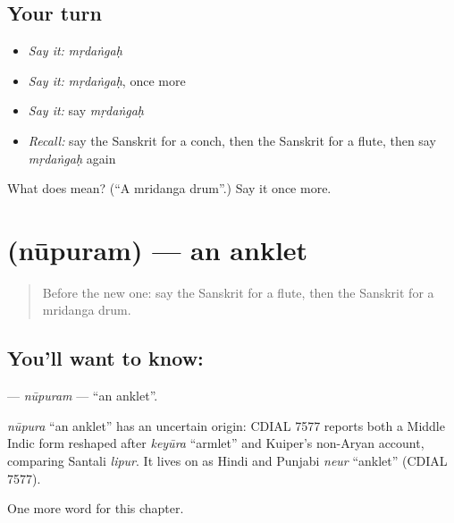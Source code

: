 \subsection*{Your turn}
\begin{itemize}
\raggedright
  \item \emph{Say it:} \emph{mṛdaṅgaḥ}
  \item \emph{Say it:} \emph{mṛdaṅgaḥ}, once more
  \item \emph{Say it:} say \emph{mṛdaṅgaḥ}
  \item \emph{Recall:} say the Sanskrit for a conch, then the Sanskrit for a flute, then say \emph{mṛdaṅgaḥ} again
\end{itemize}

\begin{tcolorbox}[breakable,colback=teal!4,colframe=teal!35!black,title={Before you move on}]
What does  mean? (\textquotedblleft{}A mridanga drum\textquotedblright{}.) Say it once more.
\end{tcolorbox}
\section[\texorpdfstring{\sk{नूपुरम्} (nūpuram)}{नूपुरम् (nūpuram)}]{ (nūpuram) — an anklet}

\label{lesson:SA-C161-nupuram}



\begin{quote}
Before the new one: say the Sanskrit for a flute, then the Sanskrit for a mridanga drum.
\end{quote}

\subsection*{You'll want to know: }
\textbf{} — \emph{nūpuram} — \textquotedblleft{}an anklet\textquotedblright{}.

\begin{cousinweb}
\emph{nūpura} \textquotedblleft{}an anklet\textquotedblright{} has an uncertain origin: CDIAL 7577 reports both a Middle Indic form reshaped after \emph{keyūra} \textquotedblleft{}armlet\textquotedblright{} and Kuiper's non-Aryan account, comparing Santali \emph{lipur}. It lives on as Hindi and Punjabi \emph{neur} \textquotedblleft{}anklet\textquotedblright{} (CDIAL 7577).
\end{cousinweb}

\begin{grammarlens}[title={What you've built}]
One more word for this chapter.
\end{grammarlens}

